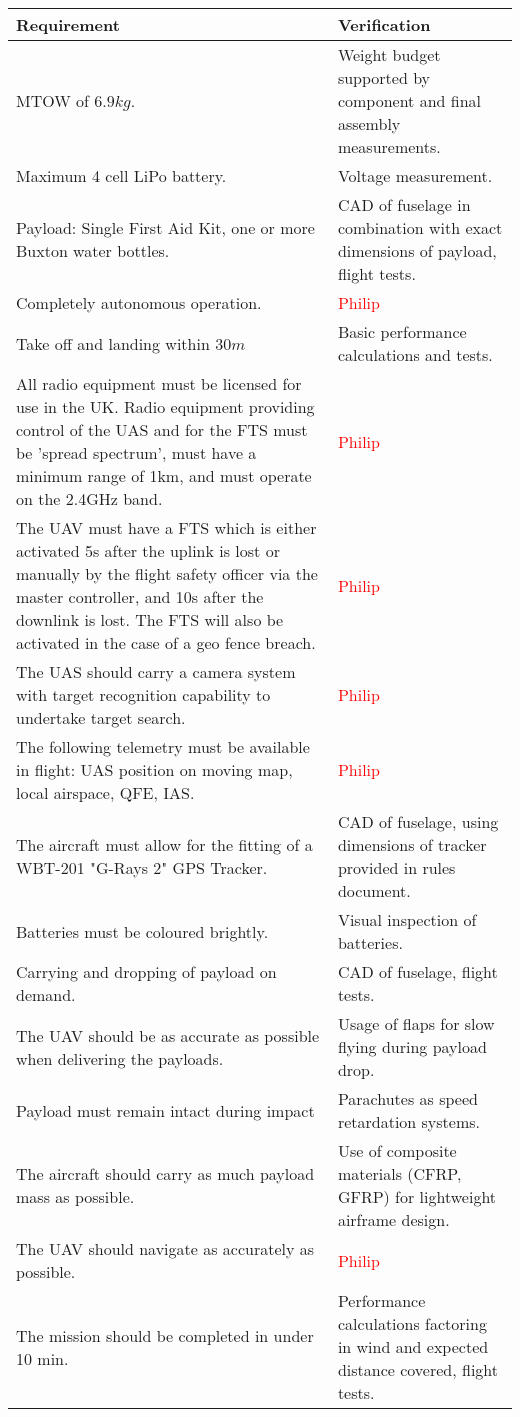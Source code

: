 \begin{longtable}{@{\makebox[0.08\textwidth][l]{\rownumber}} | p{} | p{}}
	\textbf{Requirement} & \textbf{Verification} 
	\gdef\rownumber{Req.\space\stepcounter{magicrownumbers}\arabic{magicrownumbers}} \\ \hline
	MTOW of $6.9kg$. & Weight budget supported by component and final assembly measurements.\\ \hline
	Maximum 4 cell LiPo battery. & Voltage measurement. \\ \hline
	Payload: Single First Aid Kit, one or more Buxton water bottles. & CAD of fuselage in combination with exact dimensions of payload, flight tests. \\ \hline
	Completely autonomous operation. & \textcolor{red}{Philip} \\ \hline
	Take off and landing within $30\si{m}$ & Basic performance calculations and tests. \\ \hline
	All radio equipment must be licensed for use in the UK. Radio equipment providing control of the UAS and for the FTS must be 'spread spectrum', must have a minimum range of 1km, and must operate on the 2.4GHz band. & \textcolor{red}{Philip} \\ \hline
	The UAV must have a FTS which is either activated 5s after the uplink is lost or manually by the flight safety officer via the master controller, and 10s after the downlink is lost. The FTS will also be activated in the case of a geo fence breach. & \textcolor{red}{Philip} \\ \hline
	The UAS should carry a camera system with target recognition capability to undertake target search. & \textcolor{red}{Philip} \\ \hline
	The following telemetry must be available in flight: UAS position on moving map, local airspace, QFE, IAS. & \textcolor{red}{Philip} \\ \hline
	The aircraft must allow for the fitting of a WBT-201 "G-Rays 2" GPS Tracker. & CAD of fuselage, using dimensions of tracker provided in rules document. \\ \hline
	Batteries must be coloured brightly. & Visual inspection of batteries. \\ \hline
	Carrying and dropping of payload on demand. & CAD of fuselage, flight tests.\\ \hline
	The UAV should be as accurate as possible when delivering the payloads. & Usage of flaps for slow flying during payload drop. \\ \hline
	Payload must remain intact during impact & Parachutes as speed retardation systems. \\ \hline
	The aircraft should carry as much payload mass as possible. & Use of composite materials (CFRP, GFRP) for lightweight airframe design. \\ \hline
	The UAV should navigate as accurately as possible. & \textcolor{red}{Philip} \\ \hline
	The mission should be completed in under 10 min. & Performance calculations factoring in wind and expected distance covered, flight tests. \\
\end{longtable}

